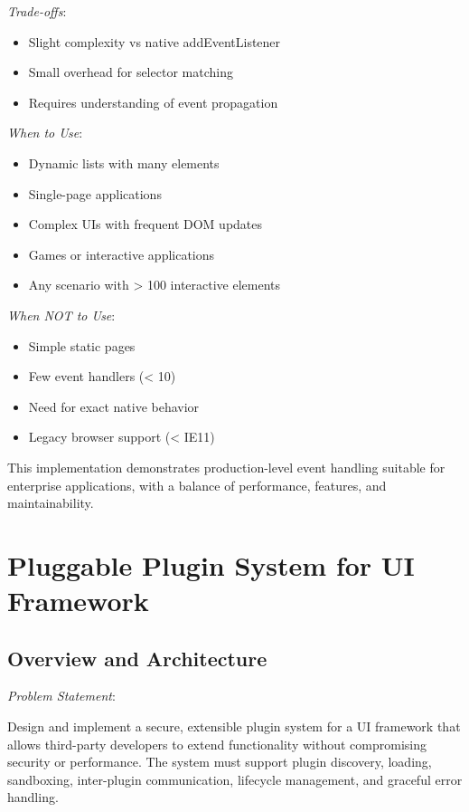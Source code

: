 \documentclass[11pt]{article}
\begin{document}
\emph{Trade-offs}:

\begin{itemize}
\item Slight complexity vs native addEventListener
\item Small overhead for selector matching
\item Requires understanding of event propagation
\end{itemize}

\emph{When to Use}:

\begin{itemize}
\item Dynamic lists with many elements
\item Single-page applications
\item Complex UIs with frequent DOM updates
\item Games or interactive applications
\item Any scenario with > 100 interactive elements
\end{itemize}

\emph{When NOT to Use}:

\begin{itemize}
\item Simple static pages
\item Few event handlers (< 10)
\item Need for exact native behavior
\item Legacy browser support (< IE11)
\end{itemize}

This implementation demonstrates production-level event handling suitable for enterprise applications, with a balance of performance, features, and maintainability.
\section{Pluggable Plugin System for UI Framework}
\label{sec:org219dc09}

\subsection{Overview and Architecture}
\label{sec:orgde8b787}

\emph{Problem Statement}:

Design and implement a secure, extensible plugin system for a UI framework that allows third-party developers to extend functionality without compromising security or performance. The system must support plugin discovery, loading, sandboxing, inter-plugin communication, lifecycle management, and graceful error handling.
\end{document}
